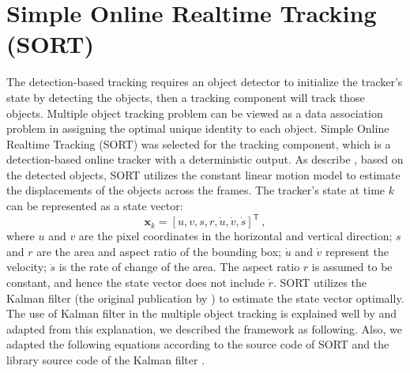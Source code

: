 \section{Simple Online Realtime Tracking (SORT)}
\label{sec:background/section_b}

The detection-based tracking requires an object detector to initialize the tracker's state by detecting the objects, then a tracking component will track those objects. Multiple object tracking problem can be viewed as a data association problem in assigning the optimal unique identity to each object. Simple Online Realtime Tracking (SORT) was selected for the tracking component, which is a detection-based online tracker with a deterministic output. As \citeauthor{bewley_simple_2016} describe \cite{bewley_simple_2016}, based on the detected objects, SORT utilizes the constant linear motion model to estimate the displacements of the objects across the frames. The tracker's state at time $k$ can be represented as a state vector:
\begin{equation}
\mathbf{x}_{k} = [u, v, s, r, \dot{u}, \dot{v}, \dot{s}]^\mathsf{T}~,
\label{eqn:state_vector}
\end{equation}
where $u$ and $v$ are the pixel coordinates in the horizontal and vertical direction; $s$ and $r$ are the area and aspect ratio of the bounding box; $\dot{u}$ and $\dot{v}$ represent the velocity; $\dot{s}$ is the rate of change of the area. The aspect ratio $r$ is assumed to be constant, and hence the state vector does not include $\dot{r}$. SORT utilizes the Kalman filter \cite{kalman_new_1960} (the original publication by \citeauthor{kalman_new_1960}) to estimate the state vector optimally. The use of Kalman filter in the multiple object tracking is explained well by \cite{li_multiple_2010} and adapted from this explanation, we described the framework as following. Also, we adapted the following equations according to the source code of SORT \cite{abewley_abewleysort_2021} and the library source code of the Kalman filter \cite{labbe_rlabbefilterpy_2021}.

